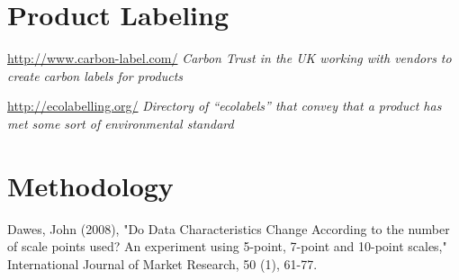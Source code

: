 \section{Product Labeling}

\url{http://www.carbon-label.com/} \emph{Carbon Trust in the UK working with vendors to create carbon labels for products}

\url{http://ecolabelling.org/} \emph{Directory of ``ecolabels'' that convey that a product has met some sort of environmental standard}

\section{Methodology}
Dawes, John (2008), "Do Data Characteristics Change According to the number of scale points used? An experiment using 5-point, 7-point and 10-point scales," International Journal of Market Research, 50 (1), 61-77.